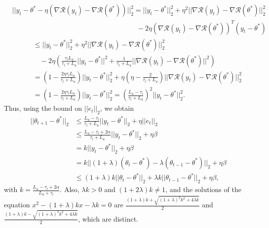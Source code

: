 \documentclass{article}
\begin{document}
\begin{align*}
&||y_t - \theta^* - \eta(\nabla\mathcal{R}(y_t) - \nabla\mathcal{R}(\theta^*))||_2^2 = ||y_t - \theta^*||_2^2 + \eta^2||\nabla\mathcal{R}(y_t) - \nabla\mathcal{R}(\theta^*)||_2^2\\
& \qquad \qquad \qquad \qquad \qquad \qquad \qquad \qquad \qquad - 2\eta(\nabla\mathcal{R}(y_t) - \nabla\mathcal{R}(\theta^*))^T(y_t - \theta^*)\\
& \qquad \quad\leq ||y_t - \theta^*||_2^2 + \eta^2||\nabla\mathcal{R}(y_t) - \nabla\mathcal{R}(\theta^*)||_2^2\\
& \qquad \qquad - 2\eta\left(\frac{\tau_lL_u}{\tau_l + L_u}||y_t - \theta^*||^2 + \frac{1}{\tau_l + L_u}||\nabla\mathcal{R}(y_t) - \nabla\mathcal{R}(\theta^*)||^2\right)\\
& \qquad \quad = \left(1 - \frac{2\eta\tau_lL_u}{\tau_l + L_u}\right)||y_t - \theta^*||_2^2 + \eta\left(\eta - \frac{2}{\tau_l + L_u}\right)||\nabla\mathcal{R}(y_t) - \nabla\mathcal{R}(\theta^*)||_2^2\\
& \qquad \quad = \left(1 - \frac{2\eta\tau_lL_u}{\tau_l + L_u}\right)||y_t - \theta^*||_2^2 = \left(\frac{L_u - \tau_l}{\tau_l + L_u}\right)^2||y_t - \theta^*||_2^2.
\end{align*}
Thus, using the bound on $||e_t||_2$, we obtain
\begin{align*}
||\theta_{t + 1} - \theta^*||_2 & \leq \frac{L_u - \tau_l}{\tau_l + L_u}||y_t - \theta^*||_2 + \eta||e_t||_2 \\
%
& \leq \frac{L_u - \tau_l + 2\alpha}{\tau_l + L_u}||y_t - \theta^*||_2 + \eta\beta \\
%
& = k||y_t - \theta^*||_2 + \eta\beta \\
%
& = k||(1 + \lambda)(\theta_t - \theta^*) - \lambda(\theta_{t - 1} - \theta^*)||_2 + \eta\beta\\
&\leq (1 + \lambda)k||\theta_t - \theta^*||_2 + \lambda k||\theta_{t - 1} - \theta^*||_2 + \eta\beta,
\end{align*}
with $k = \frac{L_u - \tau_l + 2\alpha}{L_u + \tau_l}$. Also, $\lambda k > 0$ and $(1 + 2\lambda)k \neq 1$, and the solutions of the equation $x^2 - (1 + \lambda)kx - \lambda k = 0$ are $\frac{(1 + \lambda)k + \sqrt{(1 + \lambda)^2k^2 + 4\lambda k}}{2}$ and $\frac{(1 + \lambda)k - \sqrt{(1 + \lambda)^2k^2 + 4\lambda k}}{2}$, which are distinct.
\end{document}
